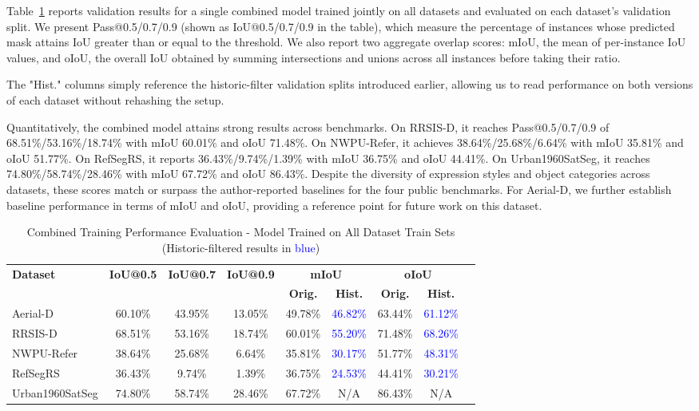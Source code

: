 Table~\ref{tab:combined_training_results} reports validation results for a single combined model trained jointly on all datasets and evaluated on each dataset's validation split. We present Pass@0.5/0.7/0.9 (shown as IoU@0.5/0.7/0.9 in the table), which measure the percentage of instances whose predicted mask attains IoU greater than or equal to the threshold. We also report two aggregate overlap scores: mIoU, the mean of per-instance IoU values, and oIoU, the overall IoU obtained by summing intersections and unions across all instances before taking their ratio.

The "Hist." columns simply reference the historic-filter validation splits introduced earlier, allowing us to read performance on both versions of each dataset without rehashing the setup.

Quantitatively, the combined model attains strong results across benchmarks. On RRSIS-D, it reaches Pass@0.5/0.7/0.9 of 68.51\%/53.16\%/18.74\% with mIoU 60.01\% and oIoU 71.48\%. On NWPU-Refer, it achieves 38.64\%/25.68\%/6.64\% with mIoU 35.81\% and oIoU 51.77\%. On RefSegRS, it reports 36.43\%/9.74\%/1.39\% with mIoU 36.75\% and oIoU 44.41\%. On Urban1960SatSeg, it reaches 74.80\%/58.74\%/28.46\% with mIoU 67.72\% and oIoU 86.43\%. Despite the diversity of expression styles and object categories across datasets, these scores match or surpass the author‑reported baselines for the four public benchmarks. For Aerial‑D, we further establish baseline performance in terms of mIoU and oIoU, providing a reference point for future work on this dataset.

\begin{table}[t]
\centering
\caption{Combined Training Performance Evaluation - Model Trained on All Dataset Train Sets (Historic-filtered results in \textcolor{blue}{blue})}
\label{tab:combined_training_results}
\begin{tabular}{@{}lcccccccc@{}}
\toprule
\textbf{Dataset} & \textbf{IoU@0.5} & \textbf{IoU@0.7} & \textbf{IoU@0.9} & \multicolumn{2}{c}{\textbf{mIoU}} & \multicolumn{2}{c}{\textbf{oIoU}} \\
\cmidrule(lr){5-6} \cmidrule(lr){7-8}
 & & & & \textbf{Orig.} & \textbf{Hist.} & \textbf{Orig.} & \textbf{Hist.} \\
\midrule
Aerial-D & 60.10\% & 43.95\% & 13.05\% & 49.78\% & \textcolor{blue}{46.82\%} & 63.44\% & \textcolor{blue}{61.12\%} \\
RRSIS-D & 68.51\% & 53.16\% & 18.74\% & 60.01\% & \textcolor{blue}{55.20\%} & 71.48\% & \textcolor{blue}{68.26\%} \\
NWPU-Refer & 38.64\% & 25.68\% & 6.64\% & 35.81\% & \textcolor{blue}{30.17\%} & 51.77\% & \textcolor{blue}{48.31\%} \\
RefSegRS & 36.43\% & 9.74\% & 1.39\% & 36.75\% & \textcolor{blue}{24.53\%} & 44.41\% & \textcolor{blue}{30.21\%} \\
Urban1960SatSeg & 74.80\% & 58.74\% & 28.46\% & 67.72\% & N/A & 86.43\% & N/A \\
\bottomrule
\end{tabular}
\end{table}

